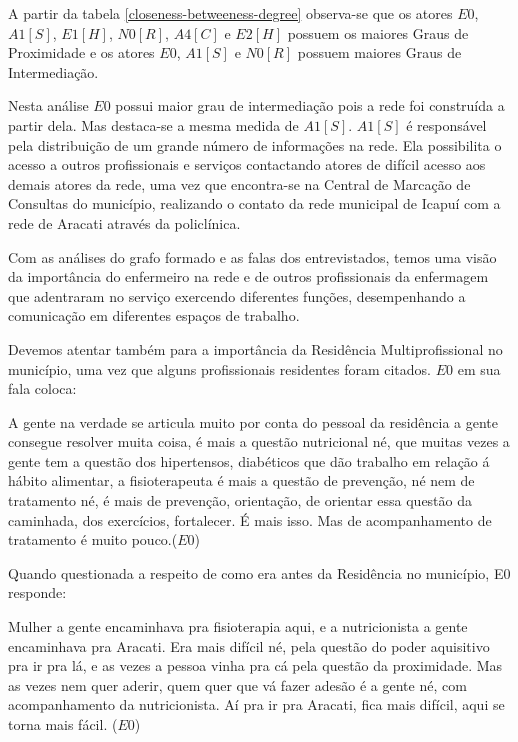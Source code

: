 A partir da tabela \ref{closeness-betweeness-degree} observa-se que os atores $E0$, $A1 [S]$, $E1 [H]$, $N0 [R]$, $A4 [C]$ e $E2 [H]$ possuem os maiores Graus de Proximidade e os atores $E0$, $A1 [S]$ e $N0 [R]$ possuem maiores Graus de Intermediação.

Nesta análise $E0$ possui maior grau de intermediação pois a rede foi construída a partir dela. Mas destaca-se a mesma medida de $A1[S]$. $A1[S]$ é responsável pela distribuição de um grande número de informações na rede. Ela possibilita o acesso a outros profissionais e serviços contactando atores de difícil acesso aos demais atores da rede, uma vez que encontra-se na Central de Marcação de Consultas do município, realizando o contato da rede municipal de Icapuí com a rede de Aracati através da policlínica.

Com as análises do grafo formado e as falas dos entrevistados, temos uma visão da importância do enfermeiro na rede e de outros profissionais da enfermagem que adentraram no serviço exercendo diferentes funções, desempenhando a comunicação  em diferentes espaços de trabalho.

Devemos atentar também para a importância da Residência Multiprofissional no município, uma vez que alguns profissionais residentes foram citados. $E0$ em sua fala coloca:

\begin{citacao}
A gente na verdade se articula muito por conta do pessoal da residência a gente consegue resolver muita coisa, é mais a questão nutricional né, que muitas vezes a gente tem a questão dos hipertensos, diabéticos que dão trabalho em relação á hábito alimentar, a fisioterapeuta é mais a questão de prevenção, né nem de tratamento né, é mais de prevenção, orientação, de orientar essa questão da caminhada, dos exercícios, fortalecer. É mais isso. Mas de acompanhamento de tratamento é muito pouco.($E0$)
\end{citacao}

Quando questionada a respeito de como era antes da Residência no município, E0 responde:

\begin{citacao}
Mulher a gente encaminhava pra fisioterapia aqui, e a nutricionista a gente encaminhava pra Aracati. Era mais difícil né, pela questão do poder aquisitivo pra ir pra lá, e as vezes a pessoa vinha pra cá pela questão da proximidade. Mas as vezes nem quer aderir, quem quer que vá fazer adesão é a gente né, com acompanhamento da nutricionista. Aí pra ir pra Aracati, fica mais difícil, aqui se torna mais fácil. ($E0$)
\end{citacao}

